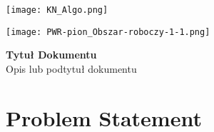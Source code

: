 \documentclass[a4paper,12pt]{article}
\begin{document}
\begin{minipage}{0.48\textwidth}
\texttt{[image: KN\_Algo.png]}
\end{minipage}
\hfill
\begin{minipage}{0.48\textwidth}
\raggedleft
\texttt{[image: PWR-pion\_Obszar-roboczy-1-1.png]}
\end{minipage}

\vspace{2cm} %

\begin{center}
\Large \textbf{Tytuł Dokumentu} \\ %
\vspace{0.5cm}
\normalsize Opis lub podtytuł dokumentu %
\end{center}



\section{Problem Statement}



\pagestyle{bibliographyStyle}


\end{document}
